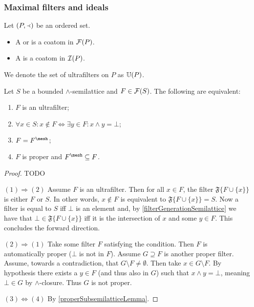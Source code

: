 \subsubsection{Maximal filters and ideals}
\begin{definition}
Let $\left( P,\Yleft \right)$ be an ordered set.
\begin{itemize}
\item A  or  is a coatom in $\operatorname{\mathcal{F}}(P)$.
\item A  is a coatom in $\operatorname{\mathcal{I}}(P)$.
\end{itemize}
We denote the set of ultrafilters on $P$ as $\operatorname{\mathbb{U}}(P)$.
\end{definition}

\begin{proposition} \label{ultrafilterCriteria}
Let $S$ be a bounded $\wedge$-semilattice and $F\in \operatorname{\mathcal{F}}(S)$. The following are equivalent:
\begin{enumerate}
\item $F$ is an ultrafilter;
\item $\forall x\in S: x\notin F \iff \exists y\in F: x\wedge y = \bot$;
\item $F = F^\mesh$;
\item $F$ is proper and $F^\mesh \subseteq F$.
\end{enumerate}
\end{proposition}
\begin{proof}
TODO

$(1)\Rightarrow (2)$ Assume $F$ is an ultrafilter. Then for all $x\in F$, the filter $\mathfrak{F}\big\{F\cup \{x\}\big\}$ is either $F$ or $S$. In other words, $x\notin F$ is equivalent to $\mathfrak{F}\big\{F\cup \{x\}\big\} = S$. Now a filter is equal to $S$ iff $\bot$ is an element and, by \ref{filterGenerationSemilattice} we have that $\bot \in \mathfrak{F}\big\{F\cup \{x\}\big\}$ iff it is the intersection of $x$ and some $y\in F$. This concludes the forward direction.

$(2)\Rightarrow (1)$ Take some filter $F$ satisfying the condition. Then $F$ is automatically proper ($\bot$ is not in $F$). Assume $G\supseteq F$ is another proper filter. Assume, towards a contradiction, that $G\setminus F \neq \emptyset$. Then take $x\in G\setminus F$. By hypothesis there exists a $y\in F$ (and thus also in $G$) such that $x\wedge y = \bot$, meaning $\bot \in G$ by $\wedge$-closure. Thus $G$ is not proper.

$(3) \Leftrightarrow (4)$ By \ref{properSubsemilatticeLemma}.
\end{proof}
